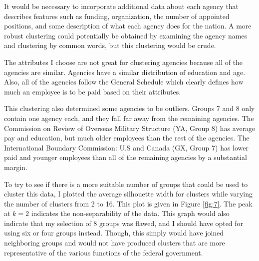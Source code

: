 \documentclass{article}
\begin{document}
    \par
    It would be necessary to incorporate additional data about each agency that describes features such as funding, organization, the number of appointed positions, and some description of what each agency does for the nation. A more robust clustering could potentially be obtained by examining the agency names and clustering by common words, but this clustering would be crude.
    \par
    The attributes I choose are not great for clustering agencies because all of the agencies are similar. Agencies have a similar distribution of education and age. Also, all of the agencies follow the General Schedule which clearly defines how much an employee is to be paid based on their attributes.
    \par
    This clustering also determined some agencies to be outliers. Groups 7 and 8 only contain one agency each, and they fall far away from the remaining agencies. The Commission on Review of Overseas Military Structure (YA, Group 8) has average pay and education, but much older employees than the rest of the agencies. The International Boundary Commission: U.S and Canada (GX, Group 7) has lower paid and younger employees than all of the remaining agencies by a substantial margin.
    \par
    To try to see if there is a more suitable number of groups that could be used to cluster this data, I plotted the average silhouette width for clusters while varying the number of clusters from 2 to 16. This plot is given in Figure \ref{fig:7}. The peak at $k = 2$ indicates the non-separability of the data. This graph would also indicate that my selection of 8 groups was flawed, and I should have opted for using six or four groups instead. Though, this simply would have joined neighboring groups and would not have produced clusters that are more representative of the various functions of the federal government.
\end{document}
